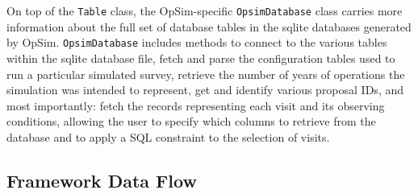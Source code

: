 \documentclass[]{spie}  %
\begin{document}
On top of the {\tt Table} class, the OpSim-specific {\tt OpsimDatabase} class
carries more information about the full set of database tables in the
sqlite databases generated by OpSim. {\tt OpsimDatabase} includes methods to
connect to the various tables within the sqlite database file, fetch
and parse the configuration tables used to run a particular simulated
survey, retrieve the number of years of operations the simulation was
intended to represent, get and identify various proposal IDs, and most
importantly: fetch the records representing each visit and its
observing conditions, allowing the user to specify which columns to
retrieve from the database and to apply a SQL constraint to the selection
of visits. 

\subsection{Framework Data Flow}
\end{document}
